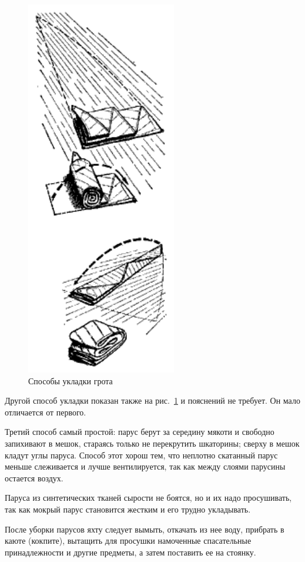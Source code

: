 \documentclass[a4paper, 12pt, twoside, final]{scrbook}
\begin{document}
\begin{figure}
   \centering
   \includegraphics{pics/104_Sposoby_ukladki_grota} %
   \caption{Способы укладки грота}
   \label{fig:104}
\end{figure}

Другой способ укладки показан также на рис.~\ref{fig:104} и пояснений не требует. Он мало отличается от первого.

Третий способ самый простой: парус берут за середину мякоти и свободно запихивают в мешок, стараясь только не перекрутить шкаторины; сверху в мешок кладут углы паруса. Способ этот хорош тем, что неплотно скатанный парус меньше слеживается и лучше вентилируется, так как между слоями парусины остается воздух.

Паруса из синтетических тканей сырости не боятся, но и их надо просушивать, так как мокрый парус становится жестким и его трудно укладывать.

После уборки парусов яхту следует вымыть, откачать из нее воду, прибрать в каюте (кокпите), вытащить для просушки намоченные спасательные принадлежности и другие предметы, а затем поставить ее на стоянку.
\end{document}
